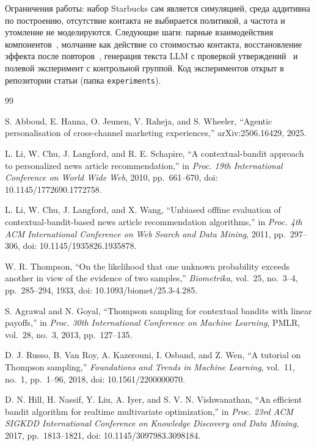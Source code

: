 \documentclass{misisarticle}
\begin{document}
Ограничения работы: набор Starbucks сам является симуляцией, среда аддитивна по построению, отсутствие контакта не выбирается политикой, а частота и утомление не моделируются. Следующие шаги: парные взаимодействия компонентов~\cite{hill2017}, молчание как действие со стоимостью контакта, восстановление эффекта после повторов~\cite{yancey2020}, генерация текста LLM с проверкой утверждений~\cite{fostiropoulos2026} и полевой эксперимент с контрольной группой. Код экспериментов открыт в репозитории статьи (папка \texttt{experiments}).

\begin{thebibliography}{99}

 S. Abboud, E. Hanna, O. Jeunen, V. Raheja, and S. Wheeler, “Agentic personalisation of cross-channel marketing experiences,” arXiv:2506.16429, 2025.

 L. Li, W. Chu, J. Langford, and R. E. Schapire, “A contextual-bandit approach to personalized news article recommendation,” in \textit{Proc. 19th International Conference on World Wide Web}, 2010, pp.~661--670, doi: 10.1145/1772690.1772758.

 L. Li, W. Chu, J. Langford, and X. Wang, “Unbiased offline evaluation of contextual-bandit-based news article recommendation algorithms,” in \textit{Proc. 4th ACM International Conference on Web Search and Data Mining}, 2011, pp.~297--306, doi: 10.1145/1935826.1935878.

 W. R. Thompson, “On the likelihood that one unknown probability exceeds another in view of the evidence of two samples,” \textit{Biometrika}, vol.~25, no.~3--4, pp.~285--294, 1933, doi: 10.1093/biomet/25.3-4.285.

 S. Agrawal and N. Goyal, “Thompson sampling for contextual bandits with linear payoffs,” in \textit{Proc. 30th International Conference on Machine Learning}, PMLR, vol.~28, no.~3, 2013, pp.~127--135.

 D. J. Russo, B. Van Roy, A. Kazerouni, I. Osband, and Z. Wen, “A tutorial on Thompson sampling,” \textit{Foundations and Trends in Machine Learning}, vol.~11, no.~1, pp.~1--96, 2018, doi: 10.1561/2200000070.

 D. N. Hill, H. Nassif, Y. Liu, A. Iyer, and S. V. N. Vishwanathan, “An efficient bandit algorithm for realtime multivariate optimization,” in \textit{Proc. 23rd ACM SIGKDD International Conference on Knowledge Discovery and Data Mining}, 2017, pp.~1813--1821, doi: 10.1145/3097983.3098184.


\end{thebibliography}
\end{document}

